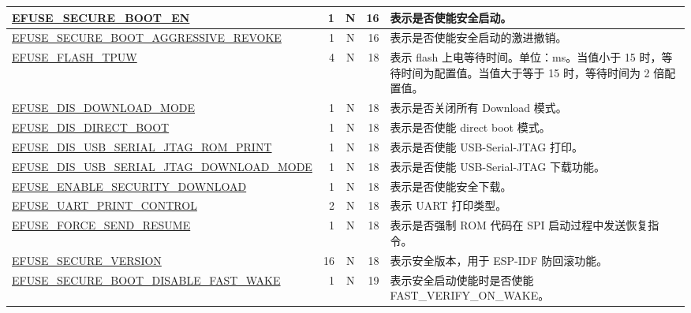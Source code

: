 \begin{longtable}[l]{ |m{8.2cm}|r|c|r|m{9.3cm}| }
    \hline
    \hyperref[fielddesc:EFUSESECUREBOOTEN]{EFUSE\_SECURE\_BOOT\_EN} & 1 & N & 16 & 表示是否使能安全启动。\\
    \hline
    \hyperref[fielddesc:EFUSESECUREBOOTAGGRESSIVEREVOKE]{EFUSE\_SECURE\_BOOT\_AGGRESSIVE\_REVOKE} & 1 & N & 16 & 表示是否使能安全启动的激进撤销。\\
    \hline
    \hyperref[fielddesc:EFUSEFLASHTPUW]{EFUSE\_FLASH\_TPUW} & 4 & N & 18 & 表示 flash 上电等待时间。单位：ms。当值小于 15 时，等待时间为配置值。当值大于等于 15 时，等待时间为 2 倍配置值。\\
    \hline
    \hyperref[fielddesc:EFUSEDISDOWNLOADMODE]{EFUSE\_DIS\_DOWNLOAD\_MODE} & 1 & N & 18 & 表示是否关闭所有 Download 模式。\\
    \hline
    \hyperref[fielddesc:EFUSEDISDIRECTBOOT]{EFUSE\_DIS\_DIRECT\_BOOT} & 1 & N & 18 & 表示是否使能 direct boot 模式。\\
    \hline
    \hyperref[fielddesc:EFUSEDISUSBSERIALJTAGROMPRINT]{EFUSE\_DIS\_USB\_SERIAL\_JTAG\_ROM\_PRINT} & 1 & N & 18 & 表示是否使能 USB-Serial-JTAG 打印。\\
    \hline
    \hyperref[fielddesc:EFUSEDISUSBSERIALJTAGDOWNLOADMODE]{EFUSE\_DIS\_USB\_SERIAL\_JTAG\_DOWNLOAD\_MODE} & 1 & N & 18 & 表示是否使能 USB-Serial-JTAG 下载功能。\\
    \hline
    \hyperref[fielddesc:EFUSEENABLESECURITYDOWNLOAD]{EFUSE\_ENABLE\_SECURITY\_DOWNLOAD} & 1 & N & 18 & 表示是否使能安全下载。\\
    \hline
    \hyperref[fielddesc:EFUSEUARTPRINTCONTROL]{EFUSE\_UART\_PRINT\_CONTROL} & 2 & N & 18 & 表示 UART 打印类型。\\
    \hline
    \hyperref[fielddesc:EFUSEFORCESENDRESUME]{EFUSE\_FORCE\_SEND\_RESUME} & 1 & N & 18 & 表示是否强制 ROM 代码在 SPI 启动过程中发送恢复指令。\\
    \hline
    \hyperref[fielddesc:EFUSESECUREVERSION]{EFUSE\_SECURE\_VERSION} & 16 & N & 18 & 表示安全版本，用于 ESP-IDF 防回滚功能。\\\hline
    \hyperref[fielddesc:EFUSESECUREBOOTDISABLEFASTWAKE]{EFUSE\_SECURE\_BOOT\_DISABLE\_FAST\_WAKE} & 1 & N & 19 & 表示安全启动使能时是否使能 FAST\_VERIFY\_ON\_WAKE。\\\hline
\end{longtable}
